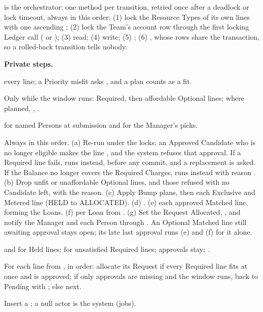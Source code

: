 \textbf{} is the orchestrator: one  method per transition, retried once after a deadlock or lock timeout, always in this order: (1) lock the Resource Types of its own lines with one ascending ; (2) lock the Team's account row through the first locking Ledger call ( or ); (3) read; (4) write; (5) ; (6) , whose rows share the transaction, so a rolled-back transition tells nobody.

\textbf{Private steps.}
\begin{description}[leftmargin=0pt,font=\normalfont\ttfamily]
\item[evaluateAll]  every line; a Priority misfit asks , and a plan counts as a fit.
\item[placeHolds] Only while the window runs: Required, then affordable Optional lines;  where planned, , .
\item[routeApprovals]  for named Persons at submission and for the Manager's picks.
\item[allocate] Always in this order. (a) Re-run  under the locks; an Approved Candidate who is no longer eligible makes the line , and the system refuses that approval. If a Required line fails,  runs instead, before any commit, and a replacement is asked. If the Balance no longer covers the Required Charges,  runs instead with reason . (b) Drop unfit or unaffordable Optional lines, and those refused with no Candidate left, with the reason. (c) Apply Bump plans, then  each Exclusive and Metered line (HELD to ALLOCATED). (d) . (e)  each approved Matched line, forming the Loans. (f)  per Loan from . (g) Set the Request Allocated, , and notify the Manager and each Person through . An Optional Matched line still awaiting approval stays open; its late last approval runs (e) and (f) for it alone.
\item[toWaiting]  and  for Held lines;  for unsatisfied Required lines; approvals stay; .
\item[onCapacityFreed] For each line from , in order: allocate its Request if every Required line fits at once and is approved; if only approvals are missing and the window runs, back to Pending with ; else next.
\item[record] Insert a ; a null actor is the system (jobs).
\end{description}

